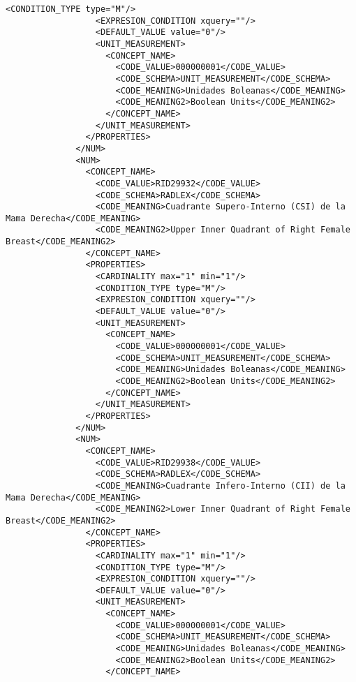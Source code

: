 \begin{lstlisting}[label=dicom-report,caption=Informe estructurado de una exploración de mama]
                  <CONDITION_TYPE type="M"/>
                  <EXPRESION_CONDITION xquery=""/>
                  <DEFAULT_VALUE value="0"/>
                  <UNIT_MEASUREMENT>
                    <CONCEPT_NAME>
                      <CODE_VALUE>000000001</CODE_VALUE>
                      <CODE_SCHEMA>UNIT_MEASUREMENT</CODE_SCHEMA>
                      <CODE_MEANING>Unidades Boleanas</CODE_MEANING>
                      <CODE_MEANING2>Boolean Units</CODE_MEANING2>
                    </CONCEPT_NAME>
                  </UNIT_MEASUREMENT>
                </PROPERTIES>
              </NUM>
              <NUM>
                <CONCEPT_NAME>
                  <CODE_VALUE>RID29932</CODE_VALUE>
                  <CODE_SCHEMA>RADLEX</CODE_SCHEMA>
                  <CODE_MEANING>Cuadrante Supero-Interno (CSI) de la Mama Derecha</CODE_MEANING>
                  <CODE_MEANING2>Upper Inner Quadrant of Right Female Breast</CODE_MEANING2>
                </CONCEPT_NAME>
                <PROPERTIES>
                  <CARDINALITY max="1" min="1"/>
                  <CONDITION_TYPE type="M"/>
                  <EXPRESION_CONDITION xquery=""/>
                  <DEFAULT_VALUE value="0"/>
                  <UNIT_MEASUREMENT>
                    <CONCEPT_NAME>
                      <CODE_VALUE>000000001</CODE_VALUE>
                      <CODE_SCHEMA>UNIT_MEASUREMENT</CODE_SCHEMA>
                      <CODE_MEANING>Unidades Boleanas</CODE_MEANING>
                      <CODE_MEANING2>Boolean Units</CODE_MEANING2>
                    </CONCEPT_NAME>
                  </UNIT_MEASUREMENT>
                </PROPERTIES>
              </NUM>
              <NUM>
                <CONCEPT_NAME>
                  <CODE_VALUE>RID29938</CODE_VALUE>
                  <CODE_SCHEMA>RADLEX</CODE_SCHEMA>
                  <CODE_MEANING>Cuadrante Infero-Interno (CII) de la Mama Derecha</CODE_MEANING>
                  <CODE_MEANING2>Lower Inner Quadrant of Right Female Breast</CODE_MEANING2>
                </CONCEPT_NAME>
                <PROPERTIES>
                  <CARDINALITY max="1" min="1"/>
                  <CONDITION_TYPE type="M"/>
                  <EXPRESION_CONDITION xquery=""/>
                  <DEFAULT_VALUE value="0"/>
                  <UNIT_MEASUREMENT>
                    <CONCEPT_NAME>
                      <CODE_VALUE>000000001</CODE_VALUE>
                      <CODE_SCHEMA>UNIT_MEASUREMENT</CODE_SCHEMA>
                      <CODE_MEANING>Unidades Boleanas</CODE_MEANING>
                      <CODE_MEANING2>Boolean Units</CODE_MEANING2>
                    </CONCEPT_NAME>

\end{lstlisting}
